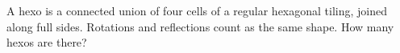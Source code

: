 A hexo is a connected union of four cells of a regular hexagonal tiling, joined along full sides. Rotations and reflections count as the same shape. How many hexos are there?

